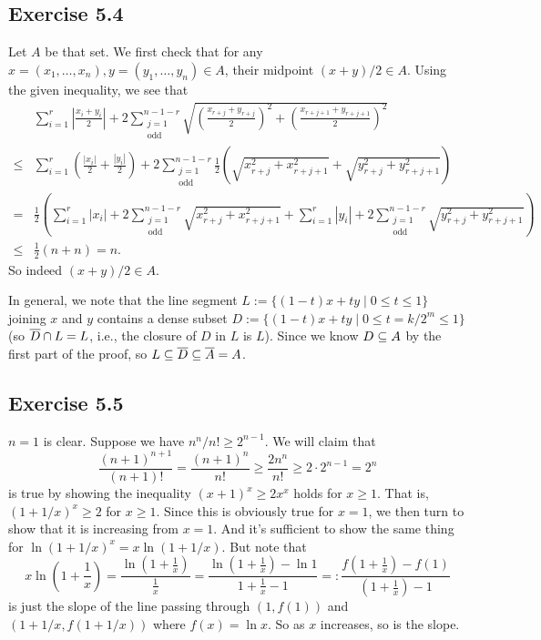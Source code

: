 \documentclass[../Marcus.tex]{subfiles}
\begin{document}
\subsection*{Exercise 5.4}

Let $A$ be that set. We first check that for any $x=(x_1,\ldots,x_n),y=(y_1,\ldots,y_n) \in A$, their midpoint $(x+y)/2\in A$. Using the given inequality, we see that
\begin{align*}
&\sum_{i=1}^r \left| \frac{x_i+y_i}{2} \right| + 2\sum_{\substack{j=1 \\ \text{odd} }}^{n-1-r} \sqrt{ \left( \frac{x_{r+j}+y_{r+j}}{2} \right)^2 + \left( \frac{x_{r+j+1}+y_{r+j+1}}{2} \right)^2 }       \\
\leq{} &\sum_{i=1}^r \left( \frac{ |x_i| }{2} + \frac{ |y_i| }{2} \right)
+ 2\sum_{\substack{j=1 \\ \text{odd} }}^{n-1-r} \frac{1}{2} \left( \sqrt{x_{r+j}^2+x_{r+j+1}^2} +  \sqrt{y_{r+j}^2+y_{r+j+1}^2} \right)      \\
={} &\frac{1}{2} \left( \sum_{i=1}^r |x_i|
+ 2\sum_{\substack{j=1 \\ \text{odd} }}^{n-1-r}  \sqrt{x_{r+j}^2+x_{r+j+1}^2} 
+ \sum_{i=1}^r |y_i| 
+ 2\sum_{\substack{j=1 \\ \text{odd} }}^{n-1-r} \sqrt{y_{r+j}^2+y_{r+j+1}^2}   \right)   \\
\leq{} &\frac{1}{2}(n+n) = n.
\end{align*}
So indeed $(x+y)/2 \in A$.

In general, we note that the line segment $L := \{(1-t)x+ty \mid 0\leq t \leq 1\}$ joining $x$ and $y$ contains a dense subset $D := \{(1-t)x+ty \mid 0 \leq t = k/2^m \leq 1\}$ (so $\overline{D} \cap L = L$, i.e., the closure of $D$ in $L$ is $L$). Since we know $D \subseteq A$ by the first part of the proof, so $L \subseteq \overline{D} \subseteq \overline{A} = A$.

\subsection*{Exercise 5.5}

$n=1$ is clear. Suppose we have $n^n/n! \geq 2^{n-1}$. We will claim that
$$
\frac{(n+1)^{n+1}}{(n+1)!} = \frac{(n+1)^n}{n!} \geq \frac{2n^n}{n!} \geq 2 \cdot 2^{n-1} = 2^n
$$
is true by showing the inequality $(x+1)^x \geq 2x^x$ holds for $x\geq 1$. That is, $(1+1/x)^x \geq 2$ for $x\geq 1$. Since this is obviously true for $x=1$, we then turn to show that it is increasing from $x=1$. And it's sufficient to show the same thing for $\ln(1+1/x)^x = x\ln(1+1/x)$. But note that
$$
x\ln\left(1+\frac{1}{x}\right)
= \frac{ \ln(1+\frac{1}{x}) }{ \frac{1}{x} }
= \frac{ \ln(1+\frac{1}{x}) -\ln1}{ 1+ \frac{1}{x} -1}
=: \frac{ f(1+\frac{1}{x}) -f(1)}{ (1+ \frac{1}{x}) -1}
$$
is just the slope of the line passing through $(1,f(1))$ and $(1+1/x,f(1+1/x))$ where $f(x)=\ln x$. So as $x$ increases, so is the slope.
\end{document}
